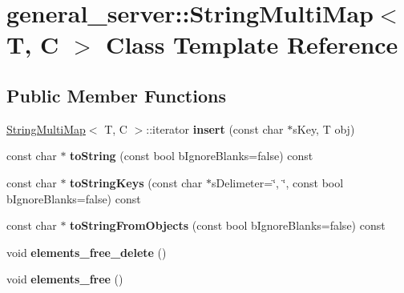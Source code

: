 \hypertarget{classgeneral__server_1_1StringMultiMap}{\section{general\-\_\-server\-:\-:\-String\-Multi\-Map$<$ \-T, \-C $>$ \-Class \-Template \-Reference}
\label{classgeneral__server_1_1StringMultiMap}
}
\subsection*{\-Public \-Member \-Functions}
\begin{DoxyCompactItemize}
\item 
\hypertarget{classgeneral__server_1_1StringMultiMap_af492638d9b0e00fff997e78bf5de4cb4}{\hyperlink{classgeneral__server_1_1StringMultiMap}{\-String\-Multi\-Map}$<$ \-T, \-C $>$\-::iterator {\bfseries insert} (const char $\ast$s\-Key, \-T obj)}\label{classgeneral__server_1_1StringMultiMap_af492638d9b0e00fff997e78bf5de4cb4}

\item 
\hypertarget{classgeneral__server_1_1StringMultiMap_a9f258d34bcc7700292cf022f9775ee5b}{const char $\ast$ {\bfseries to\-String} (const bool b\-Ignore\-Blanks=false) const }\label{classgeneral__server_1_1StringMultiMap_a9f258d34bcc7700292cf022f9775ee5b}

\item 
\hypertarget{classgeneral__server_1_1StringMultiMap_ad52e8692bcb69fda0c1b9bb0857a862d}{const char $\ast$ {\bfseries to\-String\-Keys} (const char $\ast$s\-Delimeter=\char`\"{}, \char`\"{}, const bool b\-Ignore\-Blanks=false) const }\label{classgeneral__server_1_1StringMultiMap_ad52e8692bcb69fda0c1b9bb0857a862d}

\item 
\hypertarget{classgeneral__server_1_1StringMultiMap_a7c546780c764c4b77118f267170c1aed}{const char $\ast$ {\bfseries to\-String\-From\-Objects} (const bool b\-Ignore\-Blanks=false) const }\label{classgeneral__server_1_1StringMultiMap_a7c546780c764c4b77118f267170c1aed}

\item 
\hypertarget{classgeneral__server_1_1StringMultiMap_a50732bc434c40e1aff3b3c2f2c04ec65}{void {\bfseries elements\-\_\-free\-\_\-delete} ()}\label{classgeneral__server_1_1StringMultiMap_a50732bc434c40e1aff3b3c2f2c04ec65}

\item 
\hypertarget{classgeneral__server_1_1StringMultiMap_a5d368b7639aa1e27633d7b61d592b2b9}{void {\bfseries elements\-\_\-free} ()}\label{classgeneral__server_1_1StringMultiMap_a5d368b7639aa1e27633d7b61d592b2b9}

\end{DoxyCompactItemize}
